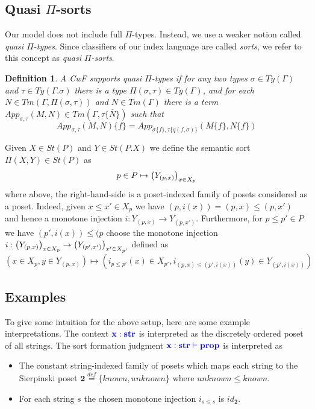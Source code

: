 \documentclass{article}
\newtheorem{lemma}{Lemma}
\newtheorem{definition}{Definition}
\newcommand{\blu}[1]{\mathbf{\color{blue}{#1}}}
\newcommand{\mbf}{\mathbf}
\newcommand{\defeq}{\overset{\mathit{def}}{=}}
\newcommand{\fm}[2]{
\left(
\tiny
#1
\normalsize
\right)_{#2}
}
\begin{document}
 
\subsection*{Quasi $\Pi$-sorts}

Our model does not include full $\Pi$-types. Instead, we use a weaker notion called \emph{quasi $\Pi$-types}. Since classifiers of our index language are called \emph{sorts}, we refer to this concept as \emph{quasi $\Pi$-sorts}.

\begin{definition}
A CwF supports \emph{quasi $\Pi$-types} if for any two types $\sigma \in \mathit{Ty}(\Gamma)$ and $\tau \in \mathit{Ty}(\Gamma . \sigma)$ there is a type $\Pi(\sigma,\tau) \in \mathit{Ty}(\Gamma)$, and for each $N \in \mathit{Tm}(\Gamma, \Pi(\sigma,\tau))$ and $N \in \mathit{Tm}(\Gamma)$ there is a term $\mathit{App}_{\sigma, \tau}(M,N) \in \mathit{Tm}(\Gamma, \tau \{ \overline{N} \})$ such that
$$\mathit{App}_{\sigma,\tau}(M,N) \{ f \} = \mathit{App}_{\sigma \{ f \}, \tau \{ q(f, \sigma) \}} (M \{ f \}, N \{ f \})$$
\end{definition}

Given $X \in \mathit{St}(P)$ and $Y \in \mathit{St}(P . X)$ we define the semantic sort $\Pi(X,Y) \in \mathit{St}(P)$ as 
$$p \in P \mapsto \fm{Y_{(p,x)}}{x \in X_p}$$
where above, the right-hand-side is a poset-indexed family of posets considered as a poset. Indeed, given $x \leq x' \in X_p$ we have $(p, i(x)) = (p,x) \leq (p,x')$ and hence a monotone injection $i : Y_{(p,x)} \to Y_{(p,x')}$.
Furthermore, for $p \leq p' \in P$ we have $(p',i(x)) \leq (p$ choose the monotone injection $i : \fm{Y_{(p,x)}}{x \in X_p} \to \fm{Y_{(p',x')}}{x' \in X_{p'}}$ defined as 
$$(x \in X_p, y \in Y_{(p,x)}) \mapsto (i_{p \leq p'}(x) \in X_{p'}, i_{(p,x) \leq (p',i(x))}(y) \in Y_{(p',i(x))})$$

\subsection*{Examples}

To give some intuition for the above setup, here are some example interpretations. The context $\blu{x : str}$ is interpreted as the discretely ordered poset of all strings. The sort formation judgment $\blu{x : str \vdash prop}$ is interpreted as 

\begin{itemize}
\item The constant string-indexed family of posets which maps each string to the Sierpinski poset $\mbf{2} \defeq \{ \mathit{known}, \mathit{unknown} \}$ where $\mathit{unknown} \leq \mathit{known}$.
\item For each string $s$ the chosen monotone injection $i_{s \leq s}$ is $\mathit{id}_{\mbf{2}}$.  
\end{itemize}
 
\end{document}
